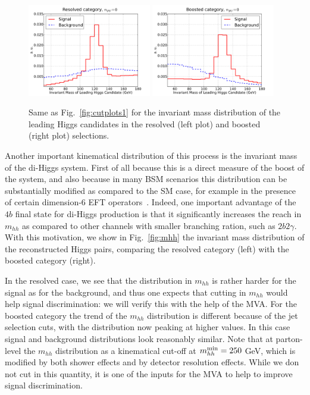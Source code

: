 \begin{figure}[t]
\begin{center}
  \includegraphics[width=0.48\textwidth]{plots/m_H0_res_C1d_noPU.pdf}
  \includegraphics[width=0.48\textwidth]{plots/m_H0_bst_C1d_noPU.pdf}
  \caption{\small Same as   Fig.~\ref{fig:cutplots1} for the invariant
    mass distribution of the leading Higgs candidates in the resolved
    (left plot) and boosted (right plot) selections.
}
\label{fig:mHHinv}
\end{center}
\end{figure}


Another important kinematical distribution of this process is the invariant mass
of the di-Higgs system.
%
First of all because this is a direct measure of the boost of the system,
and also because in many BSM scenarios this distribution can be substantially
modified as compared to the SM case, for example in the presence
of certain dimension-6 EFT operators~\cite{Azatov:2015oxa}.
%
Indeed, one important advantage of the $4b$ final state for
di-Higgs production is that it significantly increases the reach
in $m_{hh}$ as compared to other channels with smaller branching
ration,
such as $2b2\gamma$.
%
With this motivation, we show in
Fig.~\ref{fig:mhh} the invariant mass distribution of the
reconstructed Higgs pairs,
comparing the resolved category (left) with the boosted category (right).


In the resolved case, we see that the distribution
in $m_{hh}$ is rather harder for the signal as for the background,
and thus one expects that cutting in $m_{hh}$ would help signal
discrimination: we will verify this with the help of the MVA.
%
For the boosted category the trend of the $m_{hh}$ distribution
is different because of the jet selection cuts, with the
distribution now peaking at higher values.
%
In this case signal and background distributions
look reasonably similar.
%
Note that at parton-level the $m_{hh}$ distribution as a kinematical
cut-off at $m_{hh}^{\rm min}=250$ GeV, which is modified by both
shower effects and by detector resolution effects.
%
While we don not cut in this quantity, it is
one of the inputs for the MVA to help to improve signal discrimination.

